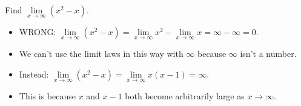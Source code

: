\begin{frame}
\begin{example} %
Find $\lim\limits_{x\rightarrow \infty}(x^2-x)$.
\begin{itemize}
\item<2-| alert@2->  WRONG: $\lim\limits_{x\to\infty} (x^2-x) = \lim\limits_{x\to\infty}x^2-\lim\limits_{x\to\infty} x = \infty-\infty = 0$.
\item<3->  We can't use the limit laws in this way with $\infty$ because $\infty$ isn't a number.
\item<4->  Instead: $\lim\limits_{x\to \infty} (x^2-x) = \lim\limits_{x\to\infty}x(x-1) = \infty$.
\item<5->  This is because $x$ and $x-1$ both become arbitrarily large as $x\to\infty$.
\end{itemize}
\end{example}
\end{frame}
